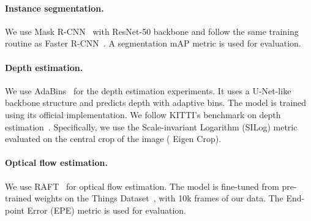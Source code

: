 \paragraph{Instance segmentation.} We use Mask R-CNN~\cite{he2017mask} with ResNet-50 backbone and follow the same training routine as  Faster R-CNN~\cite{ren2015faster}. A segmentation mAP metric is used for evaluation.

\paragraph{Depth estimation.} We use AdaBins~\cite{bhat2021adabins} for the depth estimation experiments. It uses a U-Net-like~\cite{ronneberger2015u} backbone structure and predicts depth with adaptive bins. The model is trained using its official implementation. We follow KITTI's benchmark on depth estimation~\cite{geiger2013vision}. Specifically, we use the Scale-invariant Logarithm (SILog) metric evaluated on the central crop of the image (\ie{} Eigen Crop).

\paragraph{Optical flow estimation.} We use RAFT~\cite{teed2020raft} for optical flow estimation. The model is fine-tuned from pre-trained weights on the Things Dataset~\cite{mayer2016large}, with 10k frames of our data. The End-point Error (EPE) metric is used for evaluation.

{\small
}

